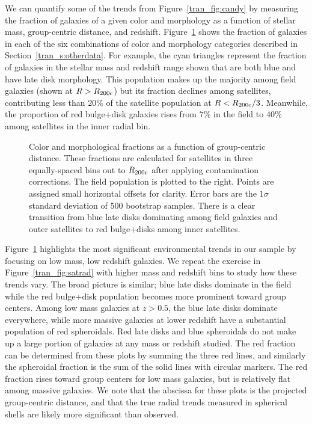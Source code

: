 We can quantify some of the trends from Figure~\ref{tran_fig:candy} by
measuring the fraction of galaxies of a given color and morphology as
a function of stellar mass, group-centric distance, and
redshift. Figure~\ref{tran_fig:satrad_single} shows the fraction of
galaxies in each of the six combinations of color and morphology
categories described in Section~\ref{tran_s:otherdata}. For example, the
cyan triangles represent the fraction of galaxies in the stellar mass
and redshift range shown that are both blue and have late disk
morphology. This population makes up the majority among field galaxies
(shown at $R > R_{\rm 200c}$) but its fraction declines among
satellites, contributing less than $20\%$ of the satellite population
at $R < R_{\rm 200c}/3$. Meanwhile, the proportion of red bulge+disk
galaxies rises from $7\%$ in the field to $40\%$ among satellites in
the inner radial bin.

\begin{figure}[htb]
\caption{Color and morphological fractions as a function of
  group-centric distance. These fractions are calculated for
  satellites in three equally-spaced bins out to $R_{\rm 200c}$ after
  applying contamination corrections. The field population is plotted
  to the right. Points are assigned small horizontal offsets for
  clarity. Error bars are the $1\sigma$ standard deviation of 500
  bootstrap samples. There is a clear transition from blue late disks
  dominating among field galaxies and outer satellites to red
  bulge+disks among inner satellites.}
\label{tran_fig:satrad_single}
\end{figure}

Figure~\ref{tran_fig:satrad_single} highlights the most significant
environmental trends in our sample by focusing on low mass, low
redshift galaxies. We repeat the exercise in Figure~\ref{tran_fig:satrad}
with higher mass and redshift bins to study how these trends vary. The
broad picture is similar; blue late disks dominate in the field while
the red bulge+disk population becomes more prominent toward group
centers. Among low mass galaxies at $z>0.5$, the blue late disks
dominate everywhere, while more massive galaxies at lower redshift
have a substantial population of red spheroidals. Red late disks and
blue spheroidals do not make up a large portion of galaxies at
any mass or redshift studied. The red fraction can be determined from these plots by
  summing the three red lines, and similarly the spheroidal fraction
  is the sum of the solid lines with circular markers. The red
  fraction rises toward group centers for low mass galaxies, but is
  relatively flat among massive galaxies. We note that the abscissa for these plots is
the projected group-centric distance, and that the true radial trends measured
in spherical shells are likely more significant than observed.


